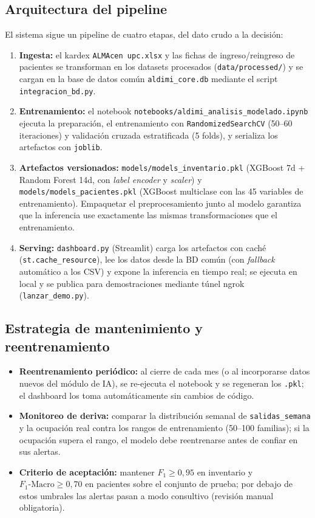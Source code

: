 \documentclass[12pt, a4paper]{article}
\begin{document}
\subsection{Arquitectura del pipeline}

El sistema sigue un pipeline de cuatro etapas, del dato crudo a la decisi\'on:

\begin{enumerate}[leftmargin=1.8em, itemsep=4pt]
  \item \textbf{Ingesta:} el kardex \texttt{ALMAcen upc.xlsx} y las fichas de ingreso/reingreso de pacientes se transforman en los datasets procesados (\texttt{data/processed/}) y se cargan en la base de datos com\'un \texttt{aldimi\_core.db} mediante el script \texttt{integracion\_bd.py}.
  \item \textbf{Entrenamiento:} el notebook \texttt{notebooks/aldimi\_analisis\_modelado.ipynb} ejecuta la preparaci\'on, el entrenamiento con \texttt{RandomizedSearchCV} (50--60 iteraciones) y validaci\'on cruzada estratificada (5 folds), y serializa los artefactos con \texttt{joblib}.
  \item \textbf{Artefactos versionados:} \texttt{models/models\_inventario.pkl} (XGBoost 7d + Random Forest 14d, con \emph{label encoder} y \emph{scaler}) y \texttt{models/models\_pacientes.pkl} (XGBoost multiclase con las 45 variables de entrenamiento). Empaquetar el preprocesamiento junto al modelo garantiza que la inferencia use exactamente las mismas transformaciones que el entrenamiento.
  \item \textbf{Serving:} \texttt{dashboard.py} (Streamlit) carga los artefactos con cach\'e (\texttt{st.cache\_resource}), lee los datos desde la BD com\'un (con \emph{fallback} autom\'atico a los CSV) y expone la inferencia en tiempo real; se ejecuta en local y se publica para demostraciones mediante t\'unel ngrok (\texttt{lanzar\_demo.py}).
\end{enumerate}

\subsection{Estrategia de mantenimiento y reentrenamiento}

\begin{itemize}[leftmargin=1.6em, itemsep=4pt]
  \item \textbf{Reentrenamiento peri\'odico:} al cierre de cada mes (o al incorporarse datos nuevos del m\'odulo de IA), se re-ejecuta el notebook y se regeneran los \texttt{.pkl}; el dashboard los toma autom\'aticamente sin cambios de c\'odigo.
  \item \textbf{Monitoreo de deriva:} comparar la distribuci\'on semanal de \texttt{salidas\_semana} y la ocupaci\'on real contra los rangos de entrenamiento (50--100 familias); si la ocupaci\'on supera el rango, el modelo debe reentrenarse antes de confiar en sus alertas.
  \item \textbf{Criterio de aceptaci\'on:} mantener $F_1 \geq 0{,}95$ en inventario y $F_1\text{-Macro} \geq 0{,}70$ en pacientes sobre el conjunto de prueba; por debajo de estos umbrales las alertas pasan a modo consultivo (revisi\'on manual obligatoria).
\end{itemize}
\end{document}
